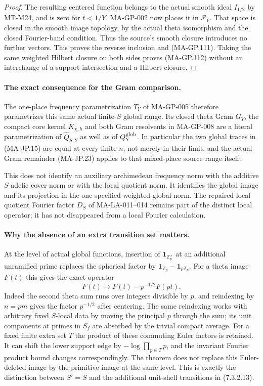 \begin{proof}
The resulting centered function belongs to the actual smooth
ideal $I_{1/2}$ by MT-M24, and is zero for $t<1/Y$.
MA-GP-002 now places it in $\mathscr P_Y$.
That space is closed in the smooth image topology, by the
actual theta isomorphism and the closed Fourier-band condition.
Thus the source's smooth closure introduces no further vectors.
This proves the reverse inclusion and (MA-GP.111).
Taking the same weighted Hilbert closure on both sides proves
(MA-GP.112) without an interchange of a support intersection
and a Hilbert closure.
\end{proof}

\paragraph{The exact consequence for the Gram comparison.}
The one-place frequency parametrization $T_Y$ of MA-GP-005
therefore parametrizes this same actual finite-$S$ global
range.  Its closed theta Gram $G_Y$, the compact core kernel
$K_{\chi,h}$ and both Gram resolvents in MA-GP-008 are a
literal parametrization of $\widehat Q_{S,Y}$ as well as
of $Q_Y^{\rm glob}$.
In particular the two global traces in (MA-JP.15) are equal
at every finite $n$, not merely in their limit, and the
actual Gram remainder (MA-JP.23) applies to that mixed-place
source range itself.

This does not identify an auxiliary archimedean frequency
norm with the additive $S$-adelic cover norm or with the
local quotient norm.  It identifies the global image and
its projection in the one specified weighted global norm.
The repaired local quotient Fourier factor $D_S$ of
MA-LA-011--014 remains part of the distinct local operator;
it has not disappeared from a local Fourier calculation.

\paragraph{Why the absence of an extra transition set matters.}
At the level of actual global functions, insertion of
$\mathbf1_{\mathbb Z_p^\times}$ at an additional unramified
prime replaces the spherical factor by
$\mathbf1_{\mathbb Z_p}-\mathbf1_{p\mathbb Z_p}$.
For a theta image $F(t)$ this gives the exact operator
\[
                 F(t)\longmapsto F(t)-p^{-1/2}F(pt).
 \tag{MA-GP.116}
\]
Indeed the second theta sum runs over integers divisible
by $p$, and reindexing by $n=pm$ gives the factor
$p^{-1/2}$ after centering.  The same reindexing works with
arbitrary fixed $S$-local data by moving the principal
$p$ through the sum; its unit components at primes in
$S_f$ are absorbed by the trivial compact average.
For a fixed finite extra set $T$ the product of these
commuting Euler factors is retained.  It can shift the lower
support edge by $-\log\prod_{p\in T}p$, and the invariant
Fourier product bound changes correspondingly.
The theorem does not replace this Euler-deleted image by
the primitive image at the same level.
This is exactly the distinction between $S'=S$ and the
additional unit-shell transitions in (7.3.2.13).

